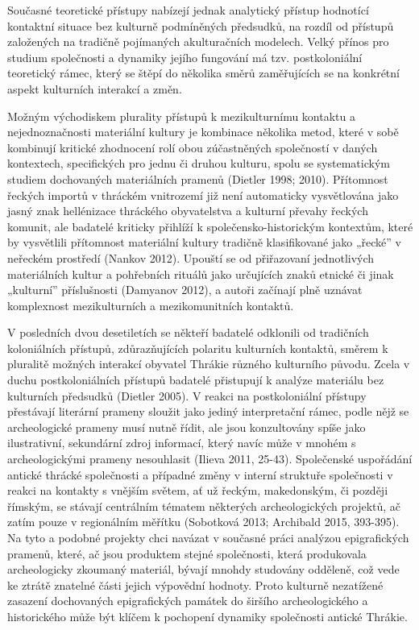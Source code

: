 Současné teoretické přístupy nabízejí jednak analytický přístup hodnotící kontaktní situace bez kulturně podmíněných předsudků, na rozdíl od přístupů založených na tradičně pojímaných akulturačních modelech. Velký přínos pro studium společnosti a dynamiky jejího fungování má tzv. postkoloniální teoretický rámec, který se štěpí do několika směrů zaměřujících se na konkrétní aspekt kulturních interakcí a změn.

Možným východiskem plurality přístupů k mezikulturnímu kontaktu a nejednoznačnosti materiální kultury je kombinace několika metod, které v sobě kombinují kritické zhodnocení rolí obou zúčastněných společností v daných kontextech, specifických pro jednu či druhou kulturu, spolu se systematickým studiem dochovaných materiálních pramenů (Dietler 1998; 2010). Přítomnost řeckých importů v thráckém vnitrozemí již není automaticky vysvětlována jako jasný znak hellénizace thráckého obyvatelstva a kulturní převahy řeckých komunit, ale badatelé kriticky přihlíží k společensko-historickým kontextům, které by vysvětlili přítomnost materiální kultury tradičně klasifikované jako „řecké” v neřeckém prostředí (Nankov 2012). Upouští se od přiřazovaní jednotlivých materiálních kultur a pohřebních rituálů jako určujících znaků etnické či jinak „kulturní” příslušnosti (Damyanov 2012), a autoři začínají plně uznávat komplexnost mezikulturních a mezikomunitních kontaktů.

V posledních dvou desetiletích se někteří badatelé odklonili od tradičních koloniálních přístupů, zdůrazňujících polaritu kulturních kontaktů, směrem k pluralitě možných interakcí obyvatel Thrákie různého kulturního původu. Zcela v duchu postkoloniálních přístupů badatelé přistupují k analýze materiálu bez kulturních předsudků (Dietler 2005). V reakci na postkoloniální přístupy přestávají literární prameny sloužit jako jediný interpretační rámec, podle nějž se archeologické prameny musí nutně řídit, ale jsou konzultovány spíše jako ilustrativní, sekundární zdroj informací, který navíc může v mnohém s archeologickými prameny nesouhlasit (Ilieva 2011, 25-43). Společenské uspořádání antické thrácké společnosti a případné změny v interní struktuře společnosti v reakci na kontakty s vnějším světem, ať už řeckým, makedonským, či později římským, se stávají centrálním tématem některých archeologických projektů, ač zatím pouze v regionálním měřítku (Sobotková 2013; Archibald 2015, 393-395). Na tyto a podobné projekty chci navázat v současné práci analýzou epigrafických pramenů, které, ač jsou produktem stejné společnosti, která produkovala archeologicky zkoumaný materiál, bývají mnohdy studovány odděleně, což vede ke ztrátě znatelné části jejich výpovědní hodnoty. Proto kulturně nezatížené zasazení dochovaných epigrafických památek do širšího archeologického a historického může být klíčem k pochopení dynamiky společnosti antické Thrákie.

